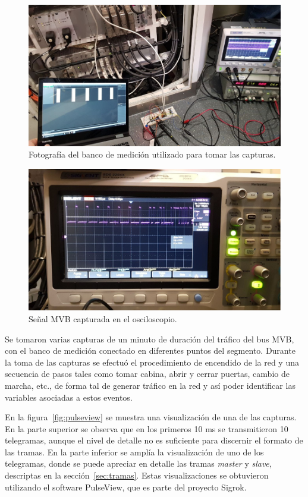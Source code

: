 \begin{figure}[htbp]
	\centering
	\includegraphics[width=\textwidth]{./Figures/foto-capturas.jpg}
	\caption{Fotografía del banco de medición utilizado para tomar las capturas.}
    \label{fig:foto-banco-capturas}
\end{figure}

\begin{figure}[htbp]
	\centering
	\includegraphics[width=\textwidth]{./Figures/osciloscopio.jpg}
	\caption{Señal MVB capturada en el osciloscopio.}
    \label{fig:osciloscopio}
\end{figure}

Se tomaron varias capturas de un minuto de duración del tráfico del bus MVB, con el banco de medición conectado en diferentes puntos del segmento.
Durante la toma de las capturas se efectuó el procedimiento de encendido de la red y una secuencia de pasos tales como tomar cabina, abrir y cerrar puertas, cambio de marcha, etc., de forma tal de generar tráfico en la red y así poder identificar las variables asociadas a estos eventos.

En la figura~\ref{fig:pulseview} se muestra una visualización de una de las capturas.
En la parte superior se observa que en los primeros 10 ms se transmitieron 10 telegramas, aunque el nivel de detalle no es suficiente para discernir el formato de las tramas.
En la parte inferior se amplía la visualización de uno de los telegramas, donde se puede apreciar en detalle las tramas \textit{master} y \textit{slave}, descriptas en la sección~\ref{sec:tramas}.
Estas visualizaciones se obtuvieron utilizando el software PulseView, que es parte del proyecto Sigrok.

